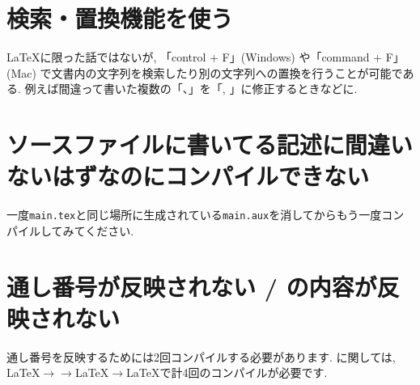 \section{検索・置換機能を使う}
\LaTeX に限った話ではないが, 「control + F」(Windows) や「command + F」(Mac) で文書内の文字列を検索したり別の文字列への置換を行うことが可能である. 例えば間違って書いた複数の「、」を「, 」に修正するときなどに. 


\section{ソースファイルに書いてる記述に間違いないはずなのにコンパイルできない}
一度\verb|main.tex|と同じ場所に生成されている\verb|main.aux|を消してからもう一度コンパイルしてみてください.  


\section{通し番号が反映されない / \BibTeX の内容が反映されない}
通し番号を反映するためには2回コンパイルする必要があります. \BibTeX に関しては, \LaTeX$\rightarrow$\BibTeX$\rightarrow$\LaTeX$\rightarrow$\LaTeX で計4回のコンパイルが必要です. 


